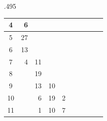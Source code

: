 \begin{table}
\begin{subtable}{.495\linewidth}
{\begin{tabular}{|c|lllllllll|}
			4                                                                              & \multicolumn{1}{r|}{6}  & \multicolumn{1}{r|}{}   & \multicolumn{1}{r|}{}   & \multicolumn{1}{r|}{}   & \multicolumn{1}{r|}{}   & \multicolumn{1}{r|}{}   & \multicolumn{1}{r|}{}   & \multicolumn{1}{r|}{}   &                         \\ \hline
			5                                                                              & \multicolumn{1}{r|}{27} & \multicolumn{1}{r|}{}   & \multicolumn{1}{r|}{}   & \multicolumn{1}{r|}{}   & \multicolumn{1}{r|}{}   & \multicolumn{1}{r|}{}   & \multicolumn{1}{r|}{}   & \multicolumn{1}{r|}{}   &                         \\ \hline
			6                                                                              & \multicolumn{1}{r|}{13} & \multicolumn{1}{r|}{}   & \multicolumn{1}{r|}{}   & \multicolumn{1}{r|}{}   & \multicolumn{1}{r|}{}   & \multicolumn{1}{r|}{}   & \multicolumn{1}{r|}{}   & \multicolumn{1}{r|}{}   &                         \\ \hline
			7                                                                              & \multicolumn{1}{r|}{4}  & \multicolumn{1}{r|}{11} & \multicolumn{1}{r|}{}   & \multicolumn{1}{r|}{}   & \multicolumn{1}{r|}{}   & \multicolumn{1}{r|}{}   & \multicolumn{1}{r|}{}   & \multicolumn{1}{r|}{}   &                         \\ \hline
			8                                                                              & \multicolumn{1}{r|}{}   & \multicolumn{1}{r|}{19} & \multicolumn{1}{r|}{}   & \multicolumn{1}{r|}{}   & \multicolumn{1}{r|}{}   & \multicolumn{1}{r|}{}   & \multicolumn{1}{r|}{}   & \multicolumn{1}{r|}{}   &                         \\ \hline
			9                                                                              & \multicolumn{1}{r|}{}   & \multicolumn{1}{r|}{13} & \multicolumn{1}{r|}{10} & \multicolumn{1}{r|}{}   & \multicolumn{1}{r|}{}   & \multicolumn{1}{r|}{}   & \multicolumn{1}{r|}{}   & \multicolumn{1}{r|}{}   &                         \\ \hline
			10                                                                             & \multicolumn{1}{r|}{}   & \multicolumn{1}{r|}{6}  & \multicolumn{1}{r|}{19} & \multicolumn{1}{r|}{2}  & \multicolumn{1}{r|}{}   & \multicolumn{1}{r|}{}   & \multicolumn{1}{r|}{}   & \multicolumn{1}{r|}{}   &                         \\ \hline
			11                                                                             & \multicolumn{1}{r|}{}   & \multicolumn{1}{r|}{1}  & \multicolumn{1}{r|}{10} & \multicolumn{1}{r|}{7}  & \multicolumn{1}{r|}{}   & \multicolumn{1}{r|}{}   & \multicolumn{1}{r|}{}   & \multicolumn{1}{r|}{}   &                         \\ \hline

\end{tabular}}
\end{subtable}
\end{table}
